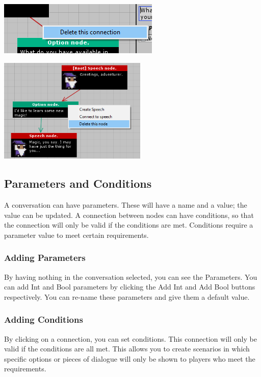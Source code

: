 \documentclass[a4paper,12pt]{article}
\begin{document}
\begin{minipage}[c]{0.45\textwidth}
\centering
\includegraphics[keepaspectratio]{img/DeleteConnection.png}
\end{minipage}
\hfill
\begin{minipage}[c]{0.45\textwidth}
\centering
\includegraphics[width=200pt, keepaspectratio]{img/DeleteNode.png}
\end{minipage}




\subsection{Parameters and Conditions}
A conversation can have parameters. These will have a name and a value; the value can be updated. A connection between nodes can have conditions, so that the connection will only be valid if the conditions are met. Conditions require a parameter value to meet certain requirements.

\subsubsection{Adding Parameters}
By having nothing in the conversation selected, you can see the Parameters. You can add Int and Bool parameters by clicking the Add Int and Add Bool buttons respectively. You can re-name these parameters and give them a default value. 

\subsubsection{Adding Conditions}
By clicking on a connection, you can set conditions. This connection will only be valid if the conditions are all met. This allows you to create scenarios in which specific options or pieces of dialogue will only be shown to players who meet the requirements. 
\end{document}
